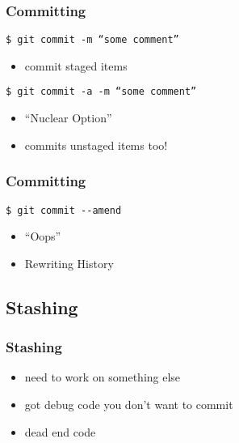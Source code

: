 \documentclass[english]{beamer}
\newcommand{\mysubsection}[2]{%
  \hypertarget{#2}{}%
  \subsection{#1}%
  \label{#2}%
}
\newcommand{\CMD}[1]{%
\texttt{\textcolor{code-blue}{#1}}%
}
\begin{document}
\begin{frame}
\frametitle{Committing}

\CMD{\$ git commit -m ``some comment''} \\
\begin{itemize}
        \item commit staged items
\end{itemize}

\vspace{.1\textheight}
\CMD{\$ git commit -a -m ``some comment''} \\
\begin{itemize}
        \item ``Nuclear Option'' \\
        \item commits unstaged items too!
\end{itemize}
\end{frame}

\begin{frame}
\frametitle{Committing}

\CMD{\$ git commit -{}-amend} \\
\begin{itemize}
        \item ``Oops'' \\
        \item Rewriting History
\end{itemize}
\end{frame}

\mysubsection{Stashing}{using:stashing}
\begin{frame}
\frametitle{Stashing}
\begin{itemize}
        \item need to work on something else
                \vspace{\baselineskip}
        \item got debug code you don't want to commit
                \vspace{\baselineskip}
        \item dead end code
\end{itemize}
\end{frame}
\end{document}
